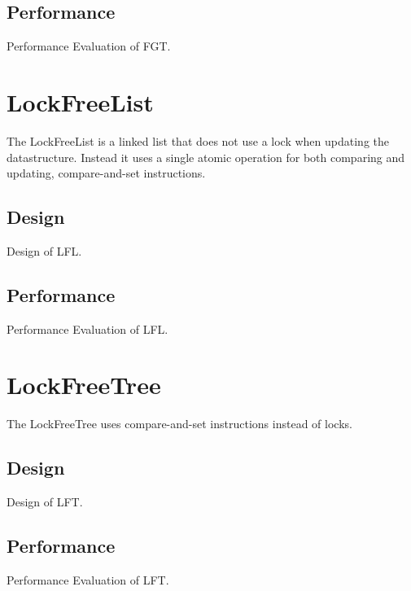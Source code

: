 \documentclass[a4paper]{article}
\begin{document}
\subsection{Performance}

Performance Evaluation of FGT.

\section{LockFreeList}

The LockFreeList is a linked list that does not use a lock when updating
the datastructure. Instead it uses a single atomic operation for both
comparing and updating, compare-and-set instructions.

\subsection{Design}

Design of LFL.

\subsection{Performance}

Performance Evaluation of LFL.

\section{LockFreeTree}

The LockFreeTree uses compare-and-set instructions instead of locks.

\subsection{Design}

Design of LFT.

\subsection{Performance}

Performance Evaluation of LFT.
\end{document}
